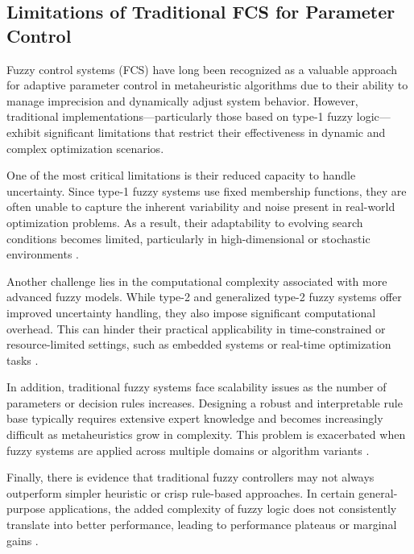 \subsection{Limitations of Traditional FCS for Parameter Control}
Fuzzy control systems (FCS) have long been recognized as a valuable approach for adaptive parameter control in metaheuristic algorithms due to their ability to manage imprecision and dynamically adjust system behavior. However, traditional implementations—particularly those based on type-1 fuzzy logic—exhibit significant limitations that restrict their effectiveness in dynamic and complex optimization scenarios.

One of the most critical limitations is their reduced capacity to handle uncertainty. Since type-1 fuzzy systems use fixed membership functions, they are often unable to capture the inherent variability and noise present in real-world optimization problems. As a result, their adaptability to evolving search conditions becomes limited, particularly in high-dimensional or stochastic environments \parencite{patel2022shadowed, castillo2021high, castillo2018generalized, patel2022type, cuevas2022generalized, castillo2019shadowed}.

Another challenge lies in the computational complexity associated with more advanced fuzzy models. While type-2 and generalized type-2 fuzzy systems offer improved uncertainty handling, they also impose significant computational overhead. This can hinder their practical applicability in time-constrained or resource-limited settings, such as embedded systems or real-time optimization tasks \parencite{castillo2021high, patel2022shadowed, castillo2019shadowed}.

In addition, traditional fuzzy systems face scalability issues as the number of parameters or decision rules increases. Designing a robust and interpretable rule base typically requires extensive expert knowledge and becomes increasingly difficult as metaheuristics grow in complexity. This problem is exacerbated when fuzzy systems are applied across multiple domains or algorithm variants \parencite{marques2011parameter, jackson2016comparative}.

Finally, there is evidence that traditional fuzzy controllers may not always outperform simpler heuristic or crisp rule-based approaches. In certain general-purpose applications, the added complexity of fuzzy logic does not consistently translate into better performance, leading to performance plateaus or marginal gains \parencite{jackson2016comparative}.

